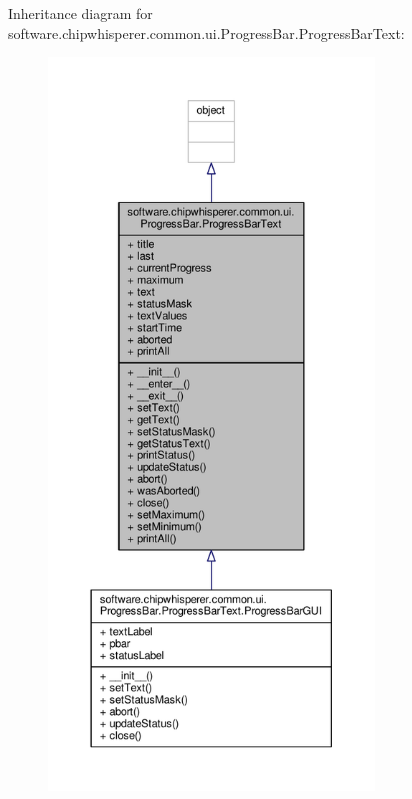 Inheritance diagram for software.\+chipwhisperer.\+common.\+ui.\+Progress\+Bar.\+Progress\+Bar\+Text\+:\nopagebreak
\begin{figure}[H]
\begin{center}
\leavevmode
\includegraphics[height=550pt]{d5/da5/classsoftware_1_1chipwhisperer_1_1common_1_1ui_1_1ProgressBar_1_1ProgressBarText__inherit__graph}
\end{center}
\end{figure}


